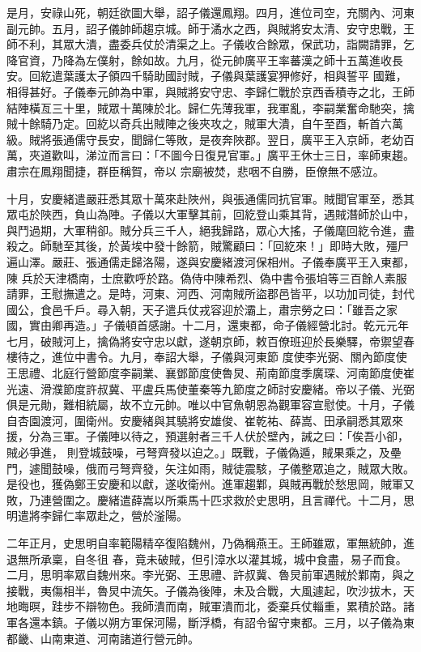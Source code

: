 \begin{pinyinscope}
 是月，安祿山死，朝廷欲圖大舉，詔子儀還鳳翔。四月，進位司空，充關內、河東副元帥。五月，詔子儀帥師趨京城。師于潏水之西，與賊將安太清、安守忠戰，王師不利，其眾大潰，盡委兵仗於清渠之上。子儀收合餘眾，保武功，詣闕請罪，乞降官資，乃降為左僕射，餘如故。九月，從元帥廣平王率蕃漢之師十五萬進收長安。回紇遣葉護太子領四千騎助國討賊，子儀與葉護宴狎修好，相與誓平
 國難，相得甚好。子儀奉元帥為中軍，與賊將安守忠、李歸仁戰於京西香積寺之北，王師結陣橫亙三十里，賊眾十萬陳於北。歸仁先薄我軍，我軍亂，李嗣業奮命馳突，擒賊十餘騎乃定。回紇以奇兵出賊陣之後夾攻之，賊軍大潰，自午至酉，斬首六萬級。賊將張通儒守長安，聞歸仁等敗，是夜奔陜郡。翌日，廣平王入京師，老幼百萬，夾道歡叫，涕泣而言曰：「不圖今日復見官軍。」廣平王休士三日，率師東趨。肅宗在鳳翔聞捷，群臣稱賀，帝以
 宗廟被焚，悲咽不自勝，臣僚無不感泣。



 十月，安慶緒遣嚴莊悉其眾十萬來赴陜州，與張通儒同抗官軍。賊聞官軍至，悉其眾屯於陜西，負山為陣。子儀以大軍擊其前，回紇登山乘其背，遇賊潛師於山中，與鬥過期，大軍稍卻。賊分兵三千人，絕我歸路，眾心大搖，子儀麾回紇令進，盡殺之。師馳至其後，於黃埃中發十餘箭，賊驚顧曰：「回紇來！」即時大敗，殭尸遍山澤。嚴莊、張通儒走歸洛陽，遂與安慶緒渡河保相州。子儀奉廣平王入東都，陳
 兵於天津橋南，士庶歡呼於路。偽侍中陳希烈、偽中書令張垍等三百餘人素服請罪，王慰撫遣之。是時，河東、河西、河南賊所盜郡邑皆平，以功加司徒，封代國公，食邑千戶。尋入朝，天子遣兵仗戎容迎於灞上，肅宗勞之曰：「雖吾之家國，實由卿再造。」子儀頓首感謝。十二月，還東都，命子儀經營北討。乾元元年七月，破賊河上，擒偽將安守忠以獻，遂朝京師，敕百僚班迎於長樂驛，帝禦望春樓待之，進位中書令。九月，奉詔大舉，子儀與河東節
 度使李光弼、關內節度使王思禮、北庭行營節度李嗣業、襄鄧節度使魯炅、荊南節度季廣琛、河南節度使崔光遠、滑濮節度許叔冀、平盧兵馬使董秦等九節度之師討安慶緒。帝以子儀、光弼俱是元勛，難相統屬，故不立元帥。唯以中官魚朝恩為觀軍容宣慰使。十月，子儀自杏園渡河，圍衛州。安慶緒與其驍將安雄俊、崔乾祐、薛嵩、田承嗣悉其眾來援，分為三軍。子儀陣以待之，預選射者三千人伏於壁內，誡之曰：「俟吾小卻，賊必爭進，
 則登城鼓噪，弓弩齊發以迫之。」既戰，子儀偽遁，賊果乘之，及壘門，遽聞鼓噪，俄而弓弩齊發，矢注如雨，賊徒震駭，子儀整眾追之，賊眾大敗。是役也，獲偽鄭王安慶和以獻，遂收衛州。進軍趨鄴，與賊再戰於愁思岡，賊軍又敗，乃連營圍之。慶緒遣薛嵩以所乘馬十匹求救於史思明，且言禪代。十二月，思明遣將李歸仁率眾赴之，營於滏陽。



 二年正月，史思明自率範陽精卒復陷魏州，乃偽稱燕王。王師雖眾，軍無統帥，進退無所承稟，自冬徂
 春，竟未破賊，但引漳水以灌其城，城中食盡，易子而食。二月，思明率眾自魏州來。李光弼、王思禮、許叔冀、魯炅前軍遇賊於鄴南，與之接戰，夷傷相半，魯炅中流矢。子儀為後陣，未及合戰，大風遽起，吹沙拔木，天地晦暝，跬步不辯物色。我師潰而南，賊軍潰而北，委棄兵仗輜重，累積於路。諸軍各還本鎮。子儀以朔方軍保河陽，斷浮橋，有詔令留守東都。三月，以子儀為東都畿、山南東道、河南諸道行營元帥。




\end{pinyinscope}
